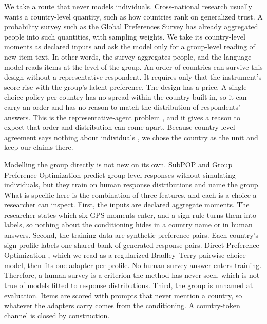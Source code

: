 We take a route that never models individuals. Cross-national research usually wants a country-level quantity, such as how countries rank on generalized trust. A probability survey such as the Global Preferences Survey \citep[GPS;][]{falk2018} has already aggregated people into such quantities, with sampling weights. We take its country-level moments as declared inputs and ask the model only for a group-level reading of new item text. In other words, the survey aggregates people, and the language model reads items at the level of the group. An order of countries can survive this design without a representative respondent. It requires only that the instrument's score rise with the group's latent preference. The design has a price. A single choice policy per country has no spread within the country built in, so it can carry an order and has no reason to match the distribution of respondents' answers. This is the representative-agent problem \citep{kirman1992}, and it gives a reason to expect that order and distribution can come apart. Because country-level agreement says nothing about individuals \citep{robinson1950}, we chose the country as the unit and keep our claims there.

Modelling the group directly is not new on its own. SubPOP \citep{suh2025} and Group Preference Optimization \citep{zhao2023gpo} predict group-level responses without simulating individuals, but they train on human response distributions and name the group. What is specific here is the combination of three features, and each is a choice a researcher can inspect. First, the inputs are declared aggregate moments. The researcher states which six GPS moments enter, and a sign rule turns them into labels, so nothing about the conditioning hides in a country name or in human answers. Second, the training data are synthetic preference pairs. Each country's sign profile labels one shared bank of generated response pairs. Direct Preference Optimization \citep{rafailov2023}, which we read as a regularized Bradley--Terry pairwise choice model, then fits one adapter per profile. No human survey answer enters training. Therefore, a human survey is a criterion the method has never seen, which is not true of models fitted to response distributions. Third, the group is unnamed at evaluation. Items are scored with prompts that never mention a country, so whatever the adapters carry comes from the conditioning. A country-token channel is closed by construction.

